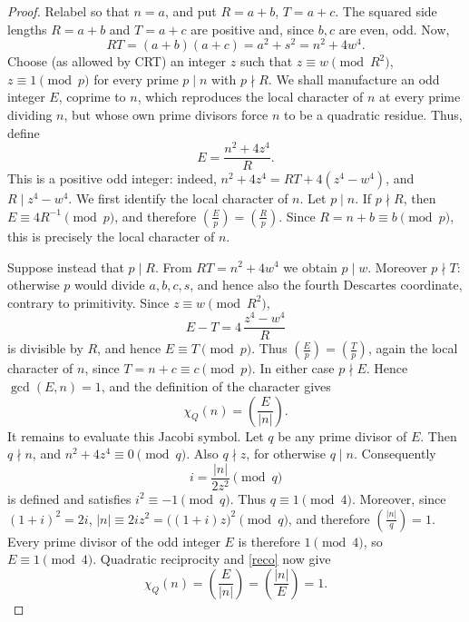 \documentclass[10pt,a4paper]{amsart}
\newcommand{\symb}[2]{\left(\frac{#1}{#2}\right)}
\begin{document}
\begin{proof}
	Relabel so that $n=a$, and put $R=a+b$, $T=a+c$. 
	The squared side lengths \(R=a+b\) and \(T=a+c\) are positive and, since \(b,c\) are even, odd. Now,
	\[
	RT=(a+b)(a+c)=a^2+s^2=n^2+4w^4.
	\]
Choose (as allowed by CRT) an integer $z$ such that	$z\equiv w\pmod{R^2}$, $z\equiv1\pmod p$ for every prime $p\mid n$ with $p\nmid R$. We shall manufacture an odd integer \(E\), coprime to \(n\), which reproduces the local character of \(n\) at every prime dividing \(n\), but whose own prime divisors force \(n\) to be a quadratic residue. Thus, define
	\[
	E=\frac{n^2+4z^4}{R}.
	\]
This is a positive odd integer: indeed,	$n^2+4z^4=RT+4(z^4-w^4)$, and $R\mid z^4-w^4$. We first identify the local character of $n$. Let $p\mid n$. If $p\nmid R$, then $E\equiv4R^{-1}\pmod p$, and therefore $\symb{E}{p}=\symb{R}{p}$. Since $R=n+b\equiv b\pmod p$, this is precisely the local character of $n$.
	
Suppose instead that $p\mid R$. From $RT=n^2+4w^4$ we obtain $p\mid w$. Moreover $p\nmid T$: otherwise $p$ would divide $a,b,c,s$, and hence also the fourth Descartes coordinate, contrary to primitivity. Since $z\equiv w\pmod{R^2}$,
	\[
	E-T=4\,\frac{z^4-w^4}{R}
	\]
is divisible by $R$, and hence $E\equiv T\pmod p$. Thus $\symb{E}{p}=\symb{T}{p}$, again the local character of $n$, since $T=n+c\equiv c\pmod p$. In either case $p\nmid E$. Hence $\gcd(E,n)=1$, and the definition of the character gives
	\begin{equation}
	\chi_Q(n)=\symb{E}{|n|}.                     
	\label{reco}
	\end{equation}
	It remains to evaluate this Jacobi symbol. Let $q$ be any prime divisor
	of $E$. Then $q\nmid n$, and $n^2+4z^4\equiv0\pmod q$. Also $q\nmid z$, for otherwise $q\mid n$. Consequently
	\[
	i=\frac{|n|}{2z^2}\pmod q
	\]
is defined and satisfies $i^2\equiv-1\pmod q$. Thus $q\equiv1\pmod4$. Moreover, since $(1+i)^2=2i$, $|n|\equiv2iz^2=\bigl((1+i)z\bigr)^2\pmod q$, and therefore $\symb{|n|}{q}=1$. Every prime divisor of the odd integer $E$ is therefore $1\pmod4$, so $E\equiv1\pmod4$. Quadratic reciprocity and \eqref{reco} now give
	\[
	\chi_Q(n)
	=\symb{E}{|n|}
	=\symb{|n|}{E}
	=1.
	\]
\end{proof}
\end{document}
